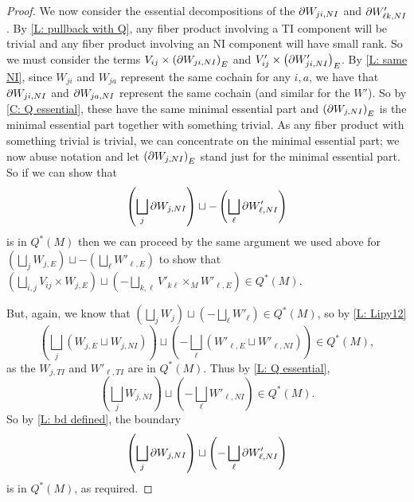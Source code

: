 \begin{proof}
	We now consider the essential decompositions of the $\partial W_{ji,NI}$ and $\partial W'_{\ell k,NI}$.
	By \cref{L: pullback with Q}, any fiber product involving a TI component will be trivial and any fiber product involving an NI component will have small rank.
	So we must consider the terms $V_{ij} \times \left(\partial W_{ji,NI}\right)_E$ and $V'_{ij} \times \left(\partial W'_{ji,NI}\right)_E$.
	By \cref{L: same NI}, since $W_{ji}$ and $W_{ja}$ represent the same cochain for any $i,a$, we have that $\partial W_{ji,NI}$ and $\partial W_{ja,NI}$ represent the same cochain (and similar for the $W'$).
	So by \cref{C: Q essential}, these have the same minimal essential part and $\left(\partial W_{j,NI}\right)_E$ is the minimal essential part together with something trivial.
	As any fiber product with something trivial is trivial, we can concentrate on the minimal essential part; we now abuse notation and let $\left(\partial W_{j,NI}\right)_E$ stand just for the minimal essential part.
	So if we can show that
	$$\left(\bigsqcup_j \partial W_{j,NI}\right) \sqcup -\left(\bigsqcup_\ell \partial W'_{\ell,NI}\right)$$
	is in $Q^*(M)$ then we can proceed by the same argument we used above for $\left(\bigsqcup_j W_{j,E}\right) \sqcup -\left(\bigsqcup_\ell W'_{\ell,E}\right)$ to show that $\left(\bigsqcup_{i,j} V_{ij} \times W_{j,E}\right) \sqcup \left(-\bigsqcup_{k,\ell} V'_{k\ell} \times_M W'_{\ell,E}\right) \in Q^*(M)$.

	But, again, we know that
	$\left(\bigsqcup_j W_{j}\right) \sqcup \left(-\bigsqcup_\ell W'_{\ell}\right) \in Q^*(M)$, so by \cref{L: Lipy12}
	$$\left(\bigsqcup_j \left(W_{j,E} \sqcup W_{j,NI}\right)\right) \sqcup \left(-\bigsqcup_\ell \left(W'_{\ell,E} \sqcup W'_{\ell,NI}\right)\right) \in Q^*(M),$$
	as the $W_{j,TI}$ and $W'_{\ell, TI}$ are in $Q^*(M)$.
	Thus by \cref{L: Q essential}, $$\left(\bigsqcup_j W_{j,NI}\right) \sqcup \left(-\bigsqcup_\ell W'_{\ell,NI}\right) \in Q^*(M).$$
	So by \cref{L: bd defined}, the boundary
	$$\left(\bigsqcup_j \partial W_{j,NI}\right) \sqcup \left(-\bigsqcup_\ell \partial W'_{\ell,NI}\right)$$ is in $Q^*(M)$, as required.
\end{proof}

